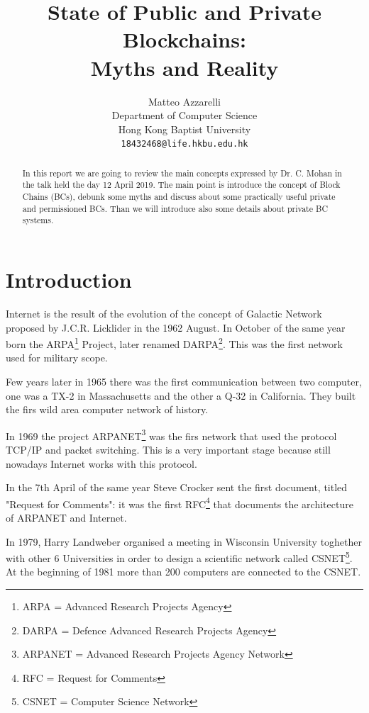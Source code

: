 \documentclass{article}
\title{State of Public and Private Blockchains:\\Myths and Reality}
\author{
  Matteo Azzarelli\\
  Department of Computer Science\\
  Hong Kong Baptist University\\
  \texttt{18432468@life.hkbu.edu.hk} \\
}
\begin{document}
\maketitle

\begin{abstract}
    In this report we are going to review the main concepts expressed by Dr. C. Mohan in the talk held the day 12 April 2019.
    The main point is introduce the concept of Block Chains (BCs), debunk some myths and discuss about some practically useful private and permissioned  BCs.
    Than we will introduce also some details about private BC systems.
\end{abstract}




\section{Introduction}
    Internet is the result of the evolution of the concept of Galactic Network~\cite{IntergalacticCN} proposed by J.C.R. Licklider in the 1962 August. In October of the same year born the ARPA\footnote{ARPA = Advanced Research Projects Agency} Project, later renamed DARPA\footnote{DARPA = Defence Advanced Research Projects Agency}\cite{DARPA}. This was the first network used for military scope.
    
    Few years later in 1965 there was the first communication between two computer, one was a TX-2 in Massachusetts and the other a Q-32 in California. They built the firs wild area computer network of history.
    
    In 1969 the project ARPANET\footnote{ARPANET = Advanced Research Projects Agency Network}\cite{ARPANET} was the firs network that used the protocol TCP/IP and packet switching. This is a very important stage because still nowadays Internet works with this protocol.
    
    In the 7th April of the same year Steve Crocker sent the first document, titled "Request for Comments": it was the first RFC\footnote{RFC = Request for Comments} that documents the architecture of ARPANET and Internet.
    
    In 1979, Harry Landweber organised a meeting in Wisconsin University toghether with other 6 Universities in order to design a scientific network called CSNET\footnote{CSNET = Computer Science Network}\cite{CSNET}. At the beginning of 1981 more than 200 computers are connected to the CSNET.
    
\end{document}
